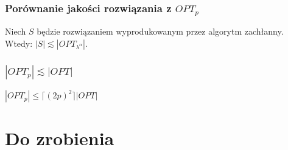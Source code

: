\documentclass[polish, t,10pt]{beamer}
\begin{document}
\begin{frame}
    \frametitle{Porównanie jakości rozwiązania z $OPT_p$}
    \begin{lemma}
        Niech $S$ będzie rozwiązaniem wyprodukowanym przez algorytm zachłanny. Wtedy:
        $|S| \lesssim |OPT_{\lambda^{\alpha}}|$.
    \end{lemma}
\end{frame}

\begin{frame}
    \frametitle{$|OPT_p| \lesssim |OPT|$}
    \begin{lemma}
        $|OPT_p| \le \lceil (2p)^2 \rceil |OPT|$
    \end{lemma}
\end{frame}

\section{Do zrobienia}
\end{document}

